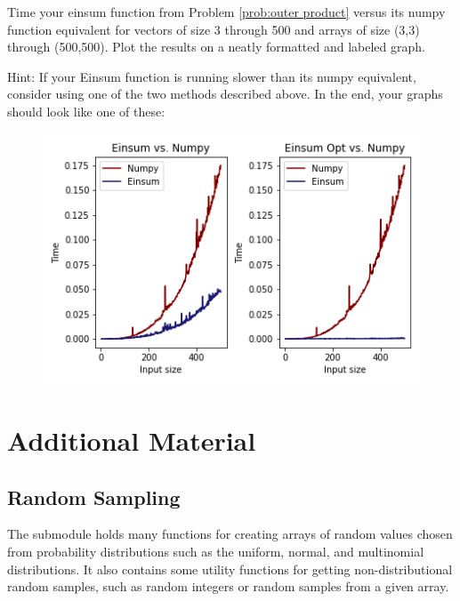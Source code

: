 \begin{problem}
Time your einsum function from Problem \ref{prob:outer product} versus its numpy function equivalent for vectors of size 3 through 500 and arrays of size (3,3) through (500,500). Plot the results on a neatly formatted and labeled graph.

\noindent Hint: If your Einsum function is running slower than its numpy equivalent, consider using one of the two methods described above. In the end, your graphs should look like one of these:

\begin{figure}[H]
    \includegraphics[width=.7\textwidth]{figures/Einsum_timing_plots.png}
\end{figure}

\end{problem}

\newpage

\section*{Additional Material} %

\subsection*{Random Sampling} %

The submodule  holds many functions for creating arrays of random values chosen from probability distributions such as the uniform, normal, and multinomial distributions.
It also contains some utility functions for getting non-distributional random samples, such as random integers or random samples from a given array.

